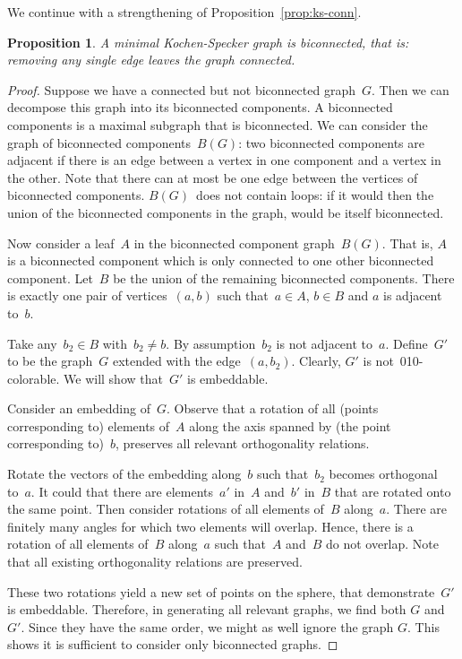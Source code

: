 \documentclass[a4paper]{article}
\newcounter{main}
\newtheorem{prop}[main]{Proposition}
\theoremstyle{definition}
\theoremstyle{remark}
\begin{document}
We continue with a strengthening of Proposition~\ref{prop:ks-conn}.
\begin{prop}
A minimal Kochen-Specker graph is biconnected,
that is: removing any single edge leaves the graph connected.
\end{prop}
\begin{proof}
Suppose we have a connected but not biconnected graph~$G$.
Then we can decompose
this graph into its biconnected components.  A biconnected components
is a maximal subgraph that is biconnected.
We can consider the graph of biconnected components~$B(G)$:
two biconnected components are adjacent if there is an edge
between a vertex in one component and a vertex in the other.
Note that there can at most be one edge between 
the vertices of biconnected components.
$B(G)$~does not contain loops: if it would
then the union of the biconnected components in the graph,
would be itself biconnected.

Now consider a leaf~$A$ in the biconnected component graph~$B(G)$.
That is, $A$ is a biconnected component which is
only connected to one other biconnected component.
Let~$B$ be the union of the remaining biconnected components.
There is exactly one pair of vertices~$(a,b)$
such that~$a \in A$, $b \in B$ and $a$ is adjacent to~$b$.

Take any~$b_2 \in B$ with~$b_2 \neq b$.
By assumption~$b_2$ is not adjacent to~$a$.
Define~$G'$ to be the graph~$G$ extended with the edge~$(a,b_2)$.
Clearly, $G'$ is not~010-colorable.  We will show that~$G'$ is embeddable.

Consider an embedding of~$G$.
Observe that a rotation of all (points corresponding to) elements of~$A$
along the axis spanned
by (the point corresponding to)~$b$, preserves all relevant
orthogonality relations.

Rotate the vectors of the embedding
along~$b$ such that~$b_2$ becomes orthogonal to~$a$.
It could that there are elements~$a'$ in~$A$
and~$b'$ in~$B$ that are rotated onto the same point.
Then consider rotations of all elements of~$B$ along~$a$.
There are finitely many angles for which two elements will overlap.
Hence, there is a rotation of all elements of~$B$ along~$a$
such that~$A$ and~$B$ do not overlap.
Note that all existing orthogonality relations are preserved.

These two rotations yield a new set of points on the sphere,
that demonstrate~$G'$ is embeddable.
Therefore, in generating all relevant graphs, we find both $G$ and
$G'$. Since they have the same order, we might as well ignore the
graph $G$. This shows it is sufficient to consider only biconnected
graphs.
\end{proof}
\end{document}
